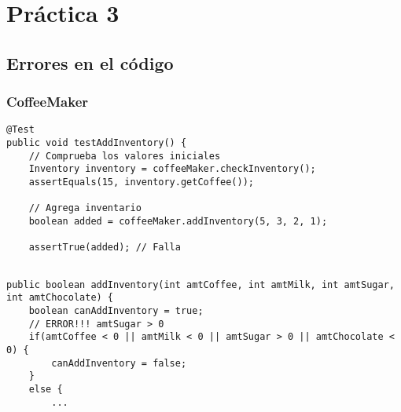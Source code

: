 \chapter{Práctica 3}
\lstset{language=Java}
\section{Errores en el código}

\subsection{CoffeeMaker}

\begin{paracol}{2}

\begin{lstlisting}
@Test
public void testAddInventory() {
    // Comprueba los valores iniciales
    Inventory inventory = coffeeMaker.checkInventory();
    assertEquals(15, inventory.getCoffee());
    
    // Agrega inventario
    boolean added = coffeeMaker.addInventory(5, 3, 2, 1);
    
    assertTrue(added); // Falla
        
\end{lstlisting}

\switchcolumn

\begin{lstlisting}
public boolean addInventory(int amtCoffee, int amtMilk, int amtSugar, int amtChocolate) {
    boolean canAddInventory = true;
    // ERROR!!! amtSugar > 0
    if(amtCoffee < 0 || amtMilk < 0 || amtSugar > 0 || amtChocolate < 0) { 
        canAddInventory = false;
    }
    else {
        ...
\end{lstlisting}
    
\end{paracol}

